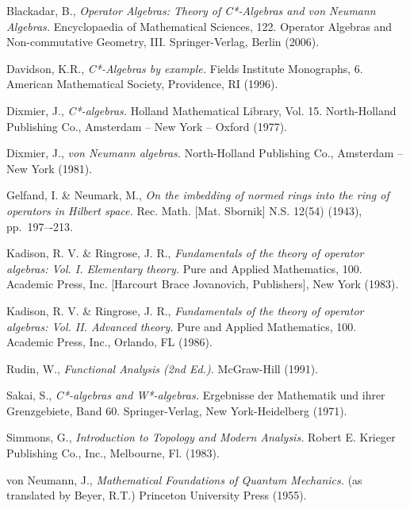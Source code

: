 \documentclass[11pt,a4paper]{report}
\theoremstyle{plain}
\theoremstyle{definition}
\newcommand{\1}{\mathbbm{1}}
\begin{document}
\begin{thebibliography}{00}
	Blackadar, B.,
	\emph{Operator Algebras: Theory of C*-Algebras and von Neumann Algebras.}
	Encyclopaedia of Mathematical Sciences, 122. Operator Algebras and Non-commutative Geometry, III. 
	Springer-Verlag, Berlin (2006).

	Davidson, K.R.,
	\emph{C*-Algebras by example.}
	Fields Institute Monographs, 6. American Mathematical Society, Providence, RI (1996).

	Dixmier, J.,
	\emph{C*-algebras.}
	Holland Mathematical Library, Vol. 15. North-Holland Publishing Co., Amsterdam -- New York -- Oxford 
	(1977).

	Dixmier, J.,
	\emph{von Neumann algebras.}
	North-Holland Publishing Co., Amsterdam -- New York (1981).

	Gelfand, I. \& Neumark, M.,
	\emph{On the imbedding of normed rings into the ring of operators in Hilbert space.}
	Rec. Math. [Mat. Sbornik] N.S. 12(54) (1943), pp.~197–-213.
	
	Kadison, R. V. \& Ringrose, J. R.,
	\emph{Fundamentals of the theory of operator algebras: Vol. I. Elementary theory.}
	Pure and Applied Mathematics, 100. Academic Press, Inc. [Harcourt Brace Jovanovich, Publishers], New 
	York (1983).

	Kadison, R. V. \& Ringrose, J. R.,
	\emph{Fundamentals of the theory of operator algebras: Vol. II. Advanced theory.}
	Pure and Applied Mathematics, 100. Academic Press, Inc., Orlando, FL (1986).

	Rudin, W.,
	\emph{Functional Analysis (2nd Ed.).}
	McGraw-Hill (1991).

	Sakai, S.,
	\emph{C*-algebras and W*-algebras.}
	Ergebnisse der Mathematik und ihrer Grenzgebiete, Band 60. Springer-Verlag, New York-Heidelberg 
	(1971).
	
	Simmons, G.,
	\emph{Introduction to Topology and Modern Analysis.}
	Robert E. Krieger Publishing Co., Inc., Melbourne, Fl. (1983).

	von Neumann, J.,
	\emph{Mathematical Foundations of Quantum Mechanics.}
	(as translated by Beyer, R.T.)
	Princeton University Press (1955).
	
\end{thebibliography}
\end{document}
